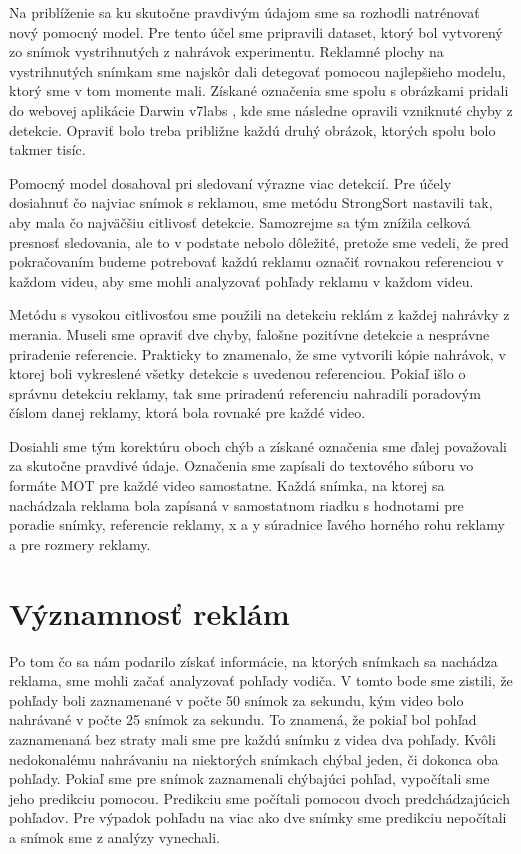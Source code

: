 Na priblíženie sa ku skutočne pravdivým údajom sme sa rozhodli natrénovať nový pomocný model. Pre tento účel sme pripravili dataset, ktorý bol vytvorený zo snímok vystrihnutých z nahrávok experimentu. Reklamné plochy na vystrihnutých snímkam sme najskôr dali detegovať pomocou najlepšieho modelu, ktorý sme v tom momente mali. Získané označenia sme spolu s obrázkami pridali do webovej aplikácie Darwin v7labs \cite{v7}, kde sme následne opravili vzniknuté chyby z detekcie. Opraviť bolo treba približne každú druhý obrázok, ktorých spolu bolo takmer tisíc. 

Pomocný model dosahoval pri sledovaní výrazne viac detekcií. Pre účely dosiahnuť čo najviac snímok s reklamou, sme metódu StrongSort nastavili tak, aby mala čo najväčšiu citlivosť detekcie. Samozrejme sa tým znížila celková presnosť sledovania, ale to v podstate nebolo dôležité, pretože sme vedeli, že pred pokračovaním budeme potrebovať každú reklamu označiť rovnakou referenciou v každom videu, aby sme mohli analyzovať pohľady reklamu v každom videu.

Metódu s vysokou citlivosťou sme použili na detekciu reklám z každej nahrávky z merania. Museli sme opraviť dve chyby, falošne pozitívne detekcie a nesprávne priradenie referencie. Prakticky to znamenalo, že sme vytvorili kópie nahrávok, v ktorej boli vykreslené všetky detekcie s uvedenou referenciou. Pokiaľ išlo o správnu detekciu reklamy, tak sme priradenú referenciu nahradili poradovým číslom danej reklamy, ktorá bola rovnaké pre každé video. 

Dosiahli sme tým korektúru oboch chýb a získané označenia sme ďalej považovali za skutočne pravdivé údaje. Označenia sme zapísali do textového súboru vo formáte MOT pre každé video samostatne. Každá snímka, na ktorej sa nachádzala reklama bola zapísaná v samostatnom riadku s hodnotami pre poradie snímky, referencie reklamy, x a y súradnice ľavého horného rohu reklamy a pre rozmery reklamy.

\section{Významnosť reklám}
Po tom čo sa nám podarilo získať informácie, na ktorých snímkach sa nachádza reklama, sme mohli začať analyzovať pohľady vodiča. V tomto bode sme zistili, že pohľady boli zaznamenané v počte 50 snímok za sekundu, kým video bolo nahrávané v počte 25 snímok za sekundu. To znamená, že pokiaľ bol pohľad zaznamenaná bez straty mali sme pre každú snímku z videa dva pohľady. Kvôli nedokonalému nahrávaniu na niektorých snímkach chýbal jeden, či dokonca oba pohľady. Pokiaľ sme pre snímok zaznamenali chýbajúci pohľad, vypočítali sme jeho predikciu pomocou. Predikciu sme počítali pomocou dvoch predchádzajúcich pohľadov. Pre výpadok pohľadu na viac ako dve snímky sme predikciu nepočítali a snímok sme z analýzy vynechali.

